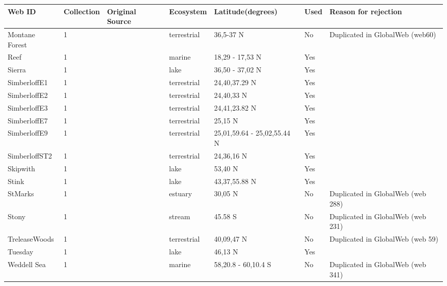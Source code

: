 \documentclass[12pt]{article}
\begin{document}
\begin{landscape}
    \begin{table}[h!]
    \centering
    {\footnotesize
      \begin{tabular}{p{2.8cm}p{1.3cm}p{5.5cm}p{2.2cm}p{2.5cm}lp{3.5cm}}
        \hline
        Web ID & Collection & Original Source & Ecosystem & Latitude(degrees) & Used  & Reason for rejection  \\
        \hline
        Montane Forest & 1 & \cite{Rasmussen1941}    & terrestrial & 36,5-37 N & No    & Duplicated in GlobalWeb (web60) \\
        Reef  & 1 & \cite{Opitz1996}  & marine & 18,29 - 17,53 N & Yes   &       \\
        Sierra & 1 & \cite{Brose2005}    & lake  & 36,50 - 37,02 N & Yes   &       \\
        SimberloffE1 & 1 & \cite{Simberloff1976}  & terrestrial & 24,40,37.29 N & Yes   &       \\
        SimberloffE2 & 1 & \cite{Simberloff1976}  & terrestrial & 24,40,33 N & Yes   &       \\
        SimberloffE3 & 1 & \cite{Simberloff1976}  & terrestrial & 24,41,23.82 N & Yes   &       \\
        SimberloffE7 & 1 & \cite{Simberloff1976}  & terrestrial & 25,15 N & Yes   &       \\
        SimberloffE9 & 1 & \cite{Simberloff1976}  & terrestrial & 25,01,59.64 - 25,02,55.44 N & Yes   &       \\
        SimberloffST2 & 1 & \cite{Simberloff1976}  & terrestrial & 24,36,16 N & Yes   &       \\
        Skipwith & 1 & \cite{Warren1989}  & lake  & 53,40 N & Yes   &       \\
        Stink & 1 & \cite{Havens1992}    & lake  & 43,37,55.88 N & Yes   &       \\
        StMarks & 1 & \cite{Christian1999}    & estuary & 30,05 N & No    & Duplicated in GlobalWeb (web 288) \\
        Stony  & 1 & \cite{Townsend1998}  & stream & 45.58 S & No    & Duplicated in GlobalWeb (web 231) \\
        TreleaseWoods & 1 & \cite{Twomey1945}    & terrestrial & 40,09,47 N & No    & Duplicated in GlobalWeb (web 59) \\
        Tuesday & 1 & \cite{Jonsson2005}    & lake  & 46,13 N & Yes   &       \\
        Weddell Sea & 1 & \cite{Brose2005}  & marine & 58,20.8 - 60,10.4 S & No    & Duplicated in GlobalWeb (web 341) \\

\end{tabular}}
\end{table}
\end{landscape}
\end{document}
